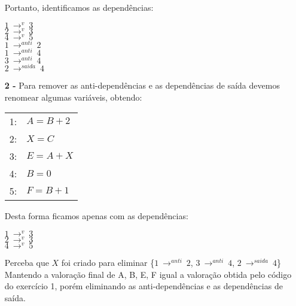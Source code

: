\documentclass[12pt]{article}
\begin{document}
\begin{itemize}
			Portanto, identificamos as dependências:\\
			\begin{center}
				$1 \ \longrightarrow^v \ 3$\\
				$2 \ \longrightarrow^v \ 3$\\
				$4 \ \longrightarrow^v \ 5$\\
				\hfill\newline
				$1 \ \longrightarrow^{anti} \ 2$\\
				$1 \ \longrightarrow^{anti} \ 4$\\
				$3 \ \longrightarrow^{anti} \ 4$\\
				\hfill\newline
				$2 \ \longrightarrow^{saida} \ 4$\\
			\end{center}
		\item[\textbf{2 -}]
			\hfill\newline
			Para remover as anti-dependências e as dependências de saída  devemos
			renomear algumas variáveis, obtendo:
			\begin{center}
				\begin{tabular}{cl}
					1: & $A = B + 2$\\
					2: & $X = C$\\
					3: & $E = A + X$\\
					4: & $B = 0$\\
					5: & $F = B + 1$\\		
				\end{tabular}			
			\end{center}
			Desta forma ficamos apenas com as dependências:
			\begin{center}
				$1 \ \longrightarrow^v \ 3$\\
				$2 \ \longrightarrow^v \ 3$\\
				$4 \ \longrightarrow^v \ 5$\\
			\end{center}
			Perceba que $X$ foi criado para eliminar \{$1 \ \longrightarrow^{anti} \ 2$,
			$3 \ \longrightarrow^{anti} \ 4$, $2 \ \longrightarrow^{saida} \ 4$\}\\
			Mantendo a valoração final de {A, B, E, F} igual a valoração obtida pelo
			código do exercício 1, porém eliminando as anti-dependências e as 
			dependências de saída.
	\end{itemize}
\end{document}
